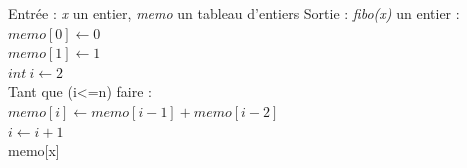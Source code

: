 \documentclass{article}
\begin{document}
\begin{algorithm}
    \caption{Fibonnaci par programmation dynamique}
    \begin{algorithmic}[1]
        \State Entrée : \textit{x} un entier, \textit{memo} un tableau d'entiers
        \State Sortie : \textit{fibo(x)} un entier
         :
            \\
            \quad $ memo[0] \leftarrow 0$
            \\
            \quad $ memo[1] \leftarrow 1$
            \\
            \quad $ int~i \leftarrow 2$
            \\
            \quad Tant que (i<=n) faire :
            \\
            \quad \quad $ memo[i] \leftarrow {memo[i-1] + memo[i-2]}$
            \\
            \quad \quad $ i \leftarrow {i + 1}$
            \\
            \quad \Return memo[x]
        \EndFunction
    \end{algorithmic}
\end{algorithm}
\end{document}
